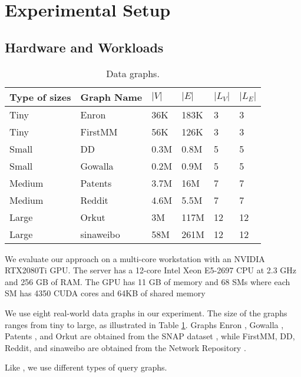\section{Experimental Setup}

\subsection{Hardware and Workloads}

\begin{table} [t!]
\centering
  \caption{Data graphs.}
  \label{tab:datagraph}
  \small
  \begin{tabular}{llllll}
  \toprule
    \textbf{Type of sizes}&\textbf{Graph Name} &$|V|$&$|E|$&$|L_V|$&$|L_E|$\\
    \midrule
    Tiny	&Enron		&36K	&183K	&3	&3 \\
    Tiny	&FirstMM 	&56K	&126K	&3	&3 \\
    Small	&DD			&0.3M	&0.8M	&5	&5\\
    Small	&Gowalla	&0.2M	&0.9M	&5	&5\\
    Medium	&Patents	&3.7M	&16M	&7	&7\\
    Medium	&Reddit		&4.6M	&5.5M	&7	&7\\
    Large	&Orkut		&3M		&117M	&12	&12\\
	Large	&sinaweibo	&58M	&261M	&12	&12\\

    \bottomrule
  \end{tabular}
\end{table}
 We evaluate our approach on a multi-core workstation with an NVIDIA RTX2080Ti GPU. The server has a
12-core Intel Xeon E5-2697 CPU at 2.3 GHz and 256 GB of RAM. The GPU has 11 GB of memory and 68 SMs where each SM has 4350 CUDA cores and
64KB of shared memory

 We use eight real-world data graphs in our experiment. The size of the graphs ranges from tiny to large, as
illustrated in Table \ref{tab:datagraph}. Graphs Enron \cite{leskovec2009community}, Gowalla \cite{cho2011friendship}, Patents
\cite{leskovec2005graphs}, and Orkut \cite{yang2015defining} are obtained from the SNAP dataset \cite{snapnets}, while FirstMM, DD, Reddit,
and sinaweibo are obtained from the Network Repository \cite{ryan2015network,nr-sigkdd16}.

 Like , we use  different types of query graphs. 

